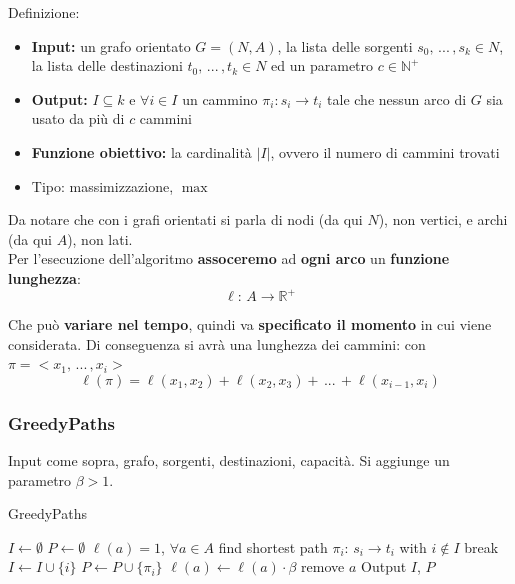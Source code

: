 \documentclass[11pt]{article}
\begin{document}
	Definizione: 
	\begin{itemize}
		\item \textbf{Input:} un grafo orientato $G = (N,A)$, la lista delle sorgenti $s_0, \, ... \, , s_k \in N$, la lista delle destinazioni $t_0, \, ... \, , t_k \in N$ ed un parametro $c \in \mathbb{N}^+$
		\item \textbf{Output:} $I \subseteq k$ e $\forall i \in I$ un cammino $\pi_i: s_i \rightarrow t_i$ tale che nessun arco di $G$ sia usato da più di $c$ cammini
		\item \textbf{Funzione obiettivo:} la cardinalità $|I|$, ovvero il numero di cammini trovati
		\item Tipo: massimizzazione, $\max$
	\end{itemize}
	
	Da notare che con i grafi orientati si parla di nodi (da qui $N$), non vertici, e archi (da qui $A$), non lati.\\
	
	Per l'esecuzione dell'algoritmo \textbf{assoceremo} ad \textbf{ogni arco} un \textbf{funzione lunghezza}:
	$$ \ell: \, A \rightarrow \mathbb{R}^+ $$
	
	Che può \textbf{variare nel tempo}, quindi va \textbf{specificato il momento} in cui viene considerata. Di conseguenza si avrà una lunghezza dei cammini: con $\pi = <x_1, \, ... \, , x_i>$
	$$ \ell (\pi) = \ell (x_1, x_2) + \ell (x_2, x_3) + \, ...  \, + \ell (x_{i-1}, x_i) $$
	
	\newpage
	
	\subsubsection{GreedyPaths}
	Input come sopra, grafo, sorgenti, destinazioni, capacità. Si aggiunge un parametro $\beta>1$.
	
	\begin{algorithm}
		\caption{GreedyPaths}
		\begin{algorithmic}
			\STATE $I \leftarrow \emptyset$
			\STATE $P \leftarrow \emptyset$
			\STATE $\ell(a) = 1 $, $\forall a \in A$
				\STATE find shortest path $\pi_i: \, s_i \rightarrow t_i$ with $i \notin I$
					\STATE break
				\ENDIF
				\STATE $I \leftarrow I \cup \{i\}$
				\STATE $P \leftarrow P \cup \{\pi_i\}$
					\STATE $\ell (a) \leftarrow \ell (a) \cdot \beta$
						\STATE remove $a$
					\ENDIF
				\ENDFOR
			\ENDWHILE
			\STATE Output $I$, $P$
		\end{algorithmic}
	\end{algorithm}
	
\end{document}
